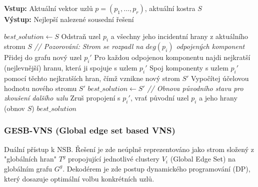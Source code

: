 \documentclass[12pt,a4paper]{article}
\theoremstyle{definition}
\begin{document}
\begin{algorithm}[H]
\caption{Prozkoumávání okolí NEN (Výměna uzlu v NSB-VNS)}
\textbf{Vstup:} Aktuální vektor uzlů $p = (p_1, \dots, p_r)$, aktuální kostra $S$ \\
\textbf{Výstup:} Nejlepší nalezené sousední řešení
\begin{algorithmic}[1]
\STATE $best\_solution \gets S$
        \STATE Odstraň uzel $p_i$ a všechny jeho incidentní hrany z aktuálního stromu $S$
        \STATE \textit{// Pozorování: Strom se rozpadl na $deg(p_i)$ odpojených komponent}
        \STATE Přidej do grafu nový uzel $p_i'$
        \STATE Pro každou odpojenou komponentu najdi nejkratší (nejlevnější) hranu, která ji spojuje s uzlem $p_i'$
        \STATE Spoj komponenty s uzlem $p_i'$ pomocí těchto nejkratších hran, čímž vznikne nový strom $S'$
        \STATE Vypočítej účelovou hodnotu nového stromu $S'$
            \STATE $best\_solution \gets S'$
        \ENDIF
        \STATE \textit{// Obnova původního stavu pro zkoušení dalšího uzlu}
        \STATE Zruš propojení s $p_i'$, vrať původní uzel $p_i$ a jeho hrany (obnov $S$)
    \ENDFOR
\ENDFOR
\RETURN $best\_solution$
\end{algorithmic}
\end{algorithm}


\subsubsection{GESB-VNS (Global edge set based VNS)}
Duální přístup k NSB. Řešení je zde neúplně reprezentováno jako strom složený z "globálních hran" $T^g$ propojující jednotlivé clustery $V_i$ (Global Edge Set) na globálním grafu $G^g$. Dekodérem je zde postup dynamického programování (DP), který dosazuje optimální volbu konkrétních uzlů.
\end{document}

